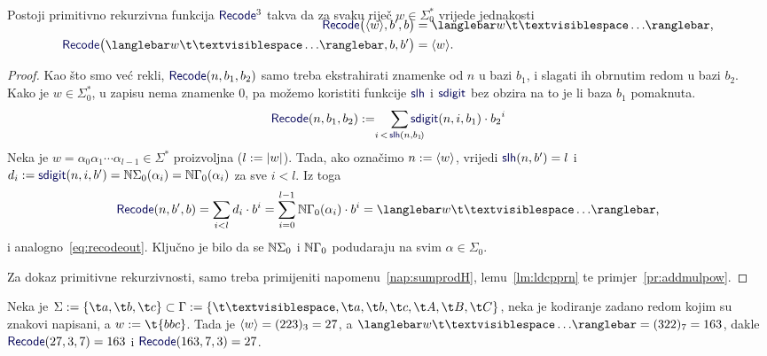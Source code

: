 \begin{lema}[{name=[primitivna rekurzivnost \emph{input\slash output} sustava trake]}]\label{lm:recodeprn}
Postoji primitivno rekurzivna funkcija $\f{Recode}^3$ takva da za svaku riječ $w\in\Sigma_0^*$ vrijede jednakosti
\begin{align}
\SwapAboveDisplaySkip
    \label{eq:recodein}\f{Recode}\bigl(\kr w,b',b\bigr)&=\knk{w\bl\ldots}\text,\\
    \label{eq:recodeout}\f{Recode}\bigl(\knk{w\bl\ldots},b,b'\bigr)&=\kr w\text.
\end{align}
\end{lema}
\begin{proof}
Kao što smo već rekli, $\f{Recode}(n,b_1,b_2)$ samo treba ekstrahirati znamenke od $n$ u bazi $b_1$, i slagati ih obrnutim redom u bazi $b_2$. Kako je $w\in\Sigma_0^*$, u zapisu nema znamenke $0$, pa 
možemo koristiti funkcije $\f{slh}$ i $\f{sdigit}$ bez obzira na to je li baza $b_1$ pomaknuta.
\begin{equation}
    \f{Recode}(n,b_1,b_2):=\quad\sum_{\mathclap{i\,<\,\f{slh}(n,b_1\!)}}\f{sdigit}(n,i,b_1)\cdot{b_2}^i
\end{equation}
Neka je $w=\alpha_0\alpha_1\dotsm\alpha_{l-1}\in\Sigma^*$ proizvoljna ($l:=\lvert w\rvert$). Tada, ako označimo $n:=\langle w\rangle$, vrijedi $\f{slh}(n,b')=l$ i $d_i:=\f{sdigit}(n,i,b')=\N\Sigma_0(\alpha_i)=\N\Gamma_0(\alpha_i)$ za sve $i<l$. Iz toga
\begin{equation}
    \f{Recode}(n,b',b)=\sum_{i<l}d_i\cdot b^i=\sum_{i=0}^{l-1}\N\Gamma_0(\alpha_i)\cdot b^i=\knk{w\bl\ldots}\text,
\end{equation}
i analogno~\eqref{eq:recodeout}. Ključno je bilo da se ${\mathbb N}\Sigma_0$ i ${\mathbb N}\Gamma_0$ podudaraju na svim $\alpha\in\Sigma_0$.

    Za dokaz primitivne rekurzivnosti, samo treba primijeniti napomenu~\ref{nap:sumprodH}, lemu~\ref{lm:ldcpprn} te primjer~\ref{pr:addmulpow}.
\end{proof}

\begin{primjer}[{name=[korištenje \emph{input\slash output} sustava trake]}]
Neka je $\Sigma:=\{\t a,\t b,\t c\}\subset\Gamma:=\{\bl,\t a,\t b,\t c,\t A,\t B,\t C\}$, neka je kodiranje zadano redom kojim su znakovi napisani, a $w:=\t{bbc}$. Tada je $\langle w\rangle=(223)_3=27$, a $\knk{w\bl\ldots}=(322)_7=163$, dakle $\f{Recode}(27,3,7)=163$ i $\f{Recode}(163,7,3)=27$.
\end{primjer}


